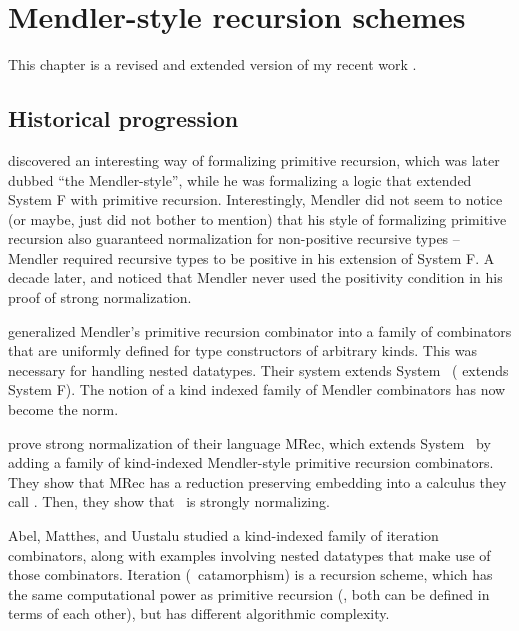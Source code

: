\chapter{Mendler-style recursion schemes}\label{ch:mendler}




This chapter is a revised and extended version of
my recent work \cite{AhnShe11}.




\section{Historical progression}

\citet{Mendler87} discovered an interesting way of formalizing
primitive recursion, which was later dubbed ``the Mendler-style'',
while he was formalizing a logic that extended System \textsf{F} with
primitive recursion. Interestingly, Mendler did not seem to notice
(or maybe, just did not bother to mention) that his style of formalizing
primitive recursion also guaranteed normalization for non-positive recursive
types -- Mendler required recursive types to be positive in his extension of
System \textsf{F}. A decade later, \citet{matthes98phd} and \citet{uustalu98phd}
noticed that Mendler never used the positivity condition in his proof of
strong normalization.

\citet{AbeMat04} generalized Mendler's primitive recursion combinator
\cite{Mendler87} into a family of combinators that are uniformly defined for
type constructors of arbitrary kinds. This was necessary for
handling nested datatypes. Their system extends System \Fw\ 
(\citet{Mendler87} extends System \textsf{F}). The notion
of a kind indexed family of Mendler combinators has now become the norm.

\citet{AbeMat04} prove strong normalization of their language \textsf{MRec},
which extends System \Fw\ by adding a family of kind-indexed Mendler-style
primitive recursion combinators. They show that \textsf{MRec} has
a reduction preserving embedding into a calculus they call \Fixw.
Then, they show that \Fixw\ is strongly normalizing.

Abel, Matthes, and Uustalu \cite{AbeMatUus03,AbeMatUus05} studied
a kind-indexed family of iteration combinators, along with examples
involving nested datatypes that make use of those combinators.
Iteration (\aka\ catamorphism) is a recursion scheme, which has the same
computational power as primitive recursion (\ie, both can be defined
in terms of each other), but has different algorithmic complexity. 

